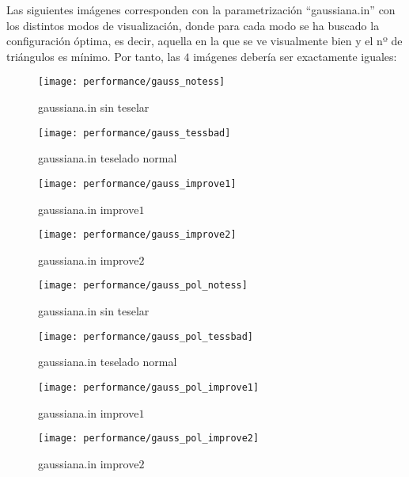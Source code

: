 	
	\newpage
	Las siguientes imágenes corresponden con la parametrización ``gaussiana.in'' con los distintos modos de visualización, donde para cada modo se ha buscado la configuración óptima, es decir, aquella en la que se ve visualmente bien y el nº de triángulos es mínimo. Por tanto, las $4$ imágenes debería ser exactamente iguales:
	\begin{figure}[h]
		\begin{minipage}{0.48\textwidth}
  			\centering
  			\texttt{[image: performance/gauss\_notess]}
  			\caption{gaussiana.in sin teselar}
		\end{minipage}\hfill
		\begin{minipage}{0.48\textwidth}
  			\centering
  			\texttt{[image: performance/gauss\_tessbad]}
  			\caption{gaussiana.in teselado normal}
		\end{minipage}\hfill
		
		\begin{minipage}{0.48\textwidth}
  			\centering
  			\texttt{[image: performance/gauss\_improve1]}
  			\caption{gaussiana.in improve$1$}
		\end{minipage}\hfill
		\begin{minipage}{0.48\textwidth}
  			\centering
  			\texttt{[image: performance/gauss\_improve2]}
  			\caption{gaussiana.in improve$2$}
		\end{minipage}\hfill
  		\label{fig:imagenes_gauss}
	\end{figure}	
	
	\newpage
	\begin{figure}[h]
		\begin{minipage}{0.48\textwidth}
  			\centering
  			\texttt{[image: performance/gauss\_pol\_notess]}
  			\caption{gaussiana.in sin teselar}
		\end{minipage}\hfill
		\begin{minipage}{0.48\textwidth}
  			\centering
  			\texttt{[image: performance/gauss\_pol\_tessbad]}
  			\caption{gaussiana.in teselado normal}
		\end{minipage}\hfill
		
		\begin{minipage}{0.48\textwidth}
  			\centering
  			\texttt{[image: performance/gauss\_pol\_improve1]}
  			\caption{gaussiana.in improve$1$}
		\end{minipage}\hfill
		\begin{minipage}{0.48\textwidth}
  			\centering
  			\texttt{[image: performance/gauss\_pol\_improve2]}
  			\caption{gaussiana.in improve$2$}
		\end{minipage}\hfill
  		\label{fig:imagenes_gauss_pol}
	\end{figure}	
	

